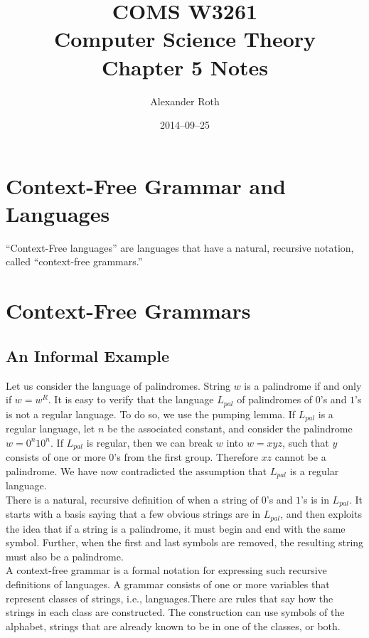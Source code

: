 \documentclass[]{article}
\begin{document}
\title{COMS W3261 \\ Computer Science Theory \\ Chapter 5 Notes}
\author{Alexander Roth}
\date{2014--09--25}
\maketitle
\newtheorem{thm}{Theorem}

\section*{Context-Free Grammar and Languages}
  ``Context-Free languages'' are languages that have a natural, recursive
  notation, called ``context-free grammars.''

\section*{Context-Free Grammars}
  \subsection*{An Informal Example}
    Let us consider the language of palindromes. String $w$ is a palindrome if
    and only if $w = w^R$. It is easy to verify that the language $L_{pal}$ of
    palindromes of $0$'s and $1$'s is not a regular language. To do so, we use
    the pumping lemma. If $L_{pal}$ is a regular language, let $n$ be the
    associated constant, and consider the palindrome $w = 0^n10^n$. If $L_{pal}$
    is regular, then we can break $w$ into $w = xyz$, such that $y$ consists of
    one or more $0$'s from the first group. Therefore $xz$ cannot be a
    palindrome. We have now contradicted the assumption that $L_{pal}$ is a
    regular language. \\
    \indent There is a natural, recursive definition of when a string of $0$'s
    and $1$'s is in $L_{pal}$. It starts with a basis saying that a few obvious
    strings are in $L_{pal}$, and then exploits the idea that if a string is a
    palindrome, it must begin and end with the same symbol. Further, when the
    first and last symbols are removed, the resulting string must also be a
    palindrome. \\
    \indent A context-free grammar is a formal notation for expressing such
    recursive definitions of languages. A grammar consists of one or more
    variables that represent classes of strings, i.e., languages.There are rules
    that say how the strings in each class are constructed. The construction can
    use symbols of the alphabet, strings that are already known to be in one of
    the classes, or both.
\end{document}
